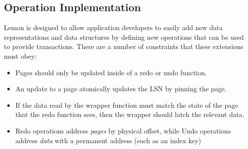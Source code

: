 \documentclass[letterpaper,twocolumn,english]{article}
\newcommand{\yad}{Lemon\xspace}
\begin{document}


%

\subsection{Operation Implementation}


\yad is designed to allow application developers to easily add new
data representations and data structures by defining new operations
that can be used to provide transactions.  There are a number of
constraints that these extensions must obey:

\begin{itemize}
\item Pages should only be updated inside of a redo or undo function.
\item An update to a page atomically updates the LSN by pinning the page.
\item If the data read by the wrapper function must match the state of
the page that the redo function sees, then the wrapper should latch
the relevant data.
\item Redo operations address {\em pages} by physical offset,
while Undo operations address {\em data} with a permanent address (such as an index key)
\end{itemize}
\end{document}

